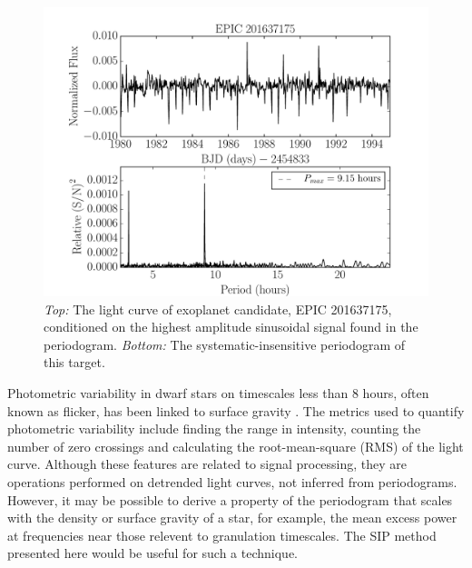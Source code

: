 \begin{figure}
\begin{center}
\includegraphics[width=6in, clip=true]{figures/planet_201637175.pdf}
\caption[Exoplanets with the SIP]
{{\it Top:} The light curve of exoplanet candidate, EPIC 201637175,
	conditioned on the highest amplitude sinusoidal signal found in the
	periodogram. {\it Bottom:} The systematic-insensitive periodogram of
	this target.}
\label{fig:planet}
\end{center}
\end{figure}

Photometric variability in dwarf stars on timescales less than 8 hours, often
known as flicker, has been linked to surface gravity
\citep[][]{Bastien2013, Kipping2014}.
The metrics used to quantify photometric variability include finding the range
in intensity, counting the number of zero crossings and calculating the
root-mean-square (RMS) of the light curve.
Although these features are related to signal processing, they are operations
performed on detrended light curves, not inferred from periodograms.
However, it may be possible to derive a property of the periodogram that scales
with the density or surface gravity of a star, for example, the mean excess
power at frequencies near those relevent to granulation timescales.
The SIP method presented here would be useful for such a technique.

